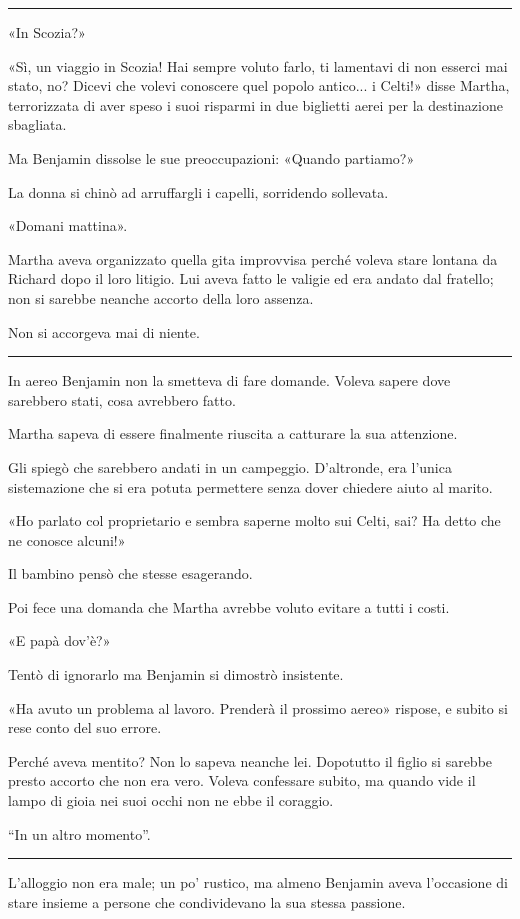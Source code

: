 \documentclass[a4paper,11pt,oneside,openright,final]{memoir}
\begin{document}
\plainbreak{1}

«In Scozia?»

«Sì, un viaggio in Scozia! Hai sempre voluto farlo, ti lamentavi di non
esserci mai stato, no? Dicevi che volevi conoscere quel popolo antico... i
Celti!» disse Martha, terrorizzata di aver speso i suoi risparmi in due
biglietti aerei per la destinazione sbagliata.

Ma Benjamin dissolse le sue preoccupazioni: «Quando partiamo?»

La donna si chinò ad arruffargli i capelli, sorridendo sollevata.

«Domani mattina».

Martha aveva organizzato quella gita improvvisa perché voleva stare lontana da
Richard dopo il loro litigio. Lui aveva fatto le valigie ed era andato dal
fratello; non si sarebbe neanche accorto della loro assenza.

Non si accorgeva mai di niente.

\plainbreak{1}

In aereo Benjamin non la smetteva di fare domande. Voleva sapere dove sarebbero
stati, cosa avrebbero fatto.

Martha sapeva di essere finalmente riuscita a catturare la sua attenzione.

Gli spiegò che sarebbero andati in un campeggio. D'altronde, era l'unica
sistemazione che si era potuta permettere senza dover chiedere aiuto al marito.

«Ho parlato col proprietario e sembra saperne molto sui Celti, sai? Ha detto
che ne conosce alcuni!»

Il bambino pensò che stesse esagerando.

Poi fece una domanda che Martha avrebbe voluto evitare a tutti i costi.

«E papà dov'è?»

Tentò di ignorarlo ma Benjamin si dimostrò insistente.

«Ha avuto un problema al lavoro. Prenderà il prossimo aereo» rispose, e
subito si rese conto del suo errore.

Perché aveva mentito? Non lo sapeva neanche lei. Dopotutto il figlio si sarebbe
presto accorto che non era vero. Voleva confessare subito, ma quando vide il
lampo di gioia nei suoi occhi non ne ebbe il coraggio.

``In un altro momento''.
\plainbreak{1}

L’alloggio non era male; un po' rustico, ma almeno Benjamin aveva l'occasione
di stare insieme a persone che condividevano la sua stessa passione.
\end{document}
